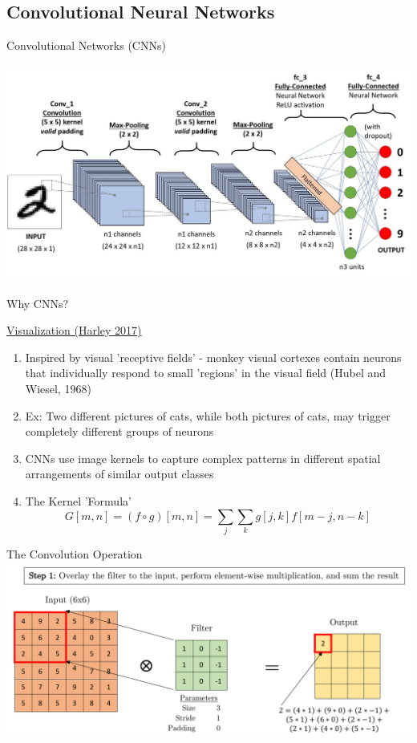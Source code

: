 \documentclass{beamer}
\begin{document}
\subsection{Convolutional Neural Networks}
\begin{frame}{Convolutional Networks (CNNs)}
\begin{center}
    \includegraphics[width=\textwidth]{nets/alexnet.jpg}
\end{center}
\end{frame}
\begin{frame}{Why CNNs?}
    \centerline{\href{http://www.cs.cmu.edu/~aharley/vis/conv/flat.html}{Visualization (Harley 2017)}}
    \begin{enumerate}[1.]
        \item Inspired by visual 'receptive fields' - monkey visual cortexes contain neurons that individually respond to small 'regions' in the visual field (Hubel and Wiesel, 1968)
        \item Ex: Two different pictures of cats, while both pictures of cats, may trigger completely different groups of neurons
        \item CNNs use image kernels to capture complex patterns in different spatial arrangements of similar output classes
        \item The Kernel 'Formula'
        $$\displaystyle G[m,n]=(f\circ g)[m,n]=\sum_j\sum_kg[j,k]f[m-j,n-k]$$
    \end{enumerate}
\end{frame}
\begin{frame}{The Convolution Operation}
    \includegraphics[width=\textwidth]{nets/conv/convstep1.pdf}
\end{frame}
\end{document}
